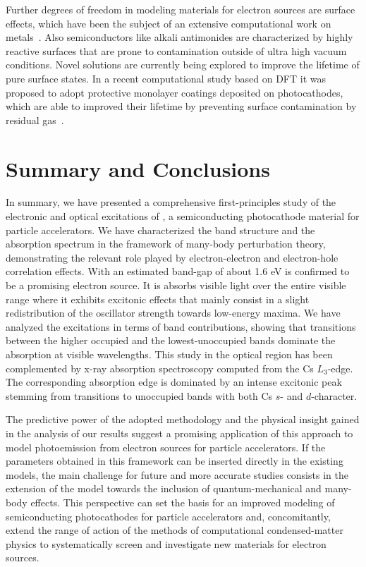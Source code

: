 \documentclass[aps,pra,superscriptaddress,twocolumn]{revtex4}
\begin{document}
Further degrees of freedom in modeling materials for electron sources are surface effects, which have been the subject of an extensive computational work on metals~\cite{cami+16cms}.
Also semiconductors like alkali antimonides are characterized by highly reactive surfaces that are prone to contamination outside of ultra high vacuum conditions.
Novel solutions are currently being explored to improve the lifetime of pure surface states.
In a recent computational study based on DFT it was proposed to adopt protective monolayer coatings deposited on  photocathodes, which are able to improved their lifetime by preventing surface contamination by residual gas~\cite{wang+18npj2dma}.  

\section{Summary and Conclusions}
\label{sec:conclusions}
In summary, we have presented a comprehensive first-principles study of the electronic and optical excitations of , a semiconducting photocathode material for particle accelerators. 
We have characterized the band structure and the absorption spectrum in the framework of many-body perturbation theory, demonstrating the relevant role played by electron-electron and electron-hole correlation effects. 
With an estimated band-gap of about 1.6 eV  is confirmed to be a promising electron source.
It is absorbs visible light over the entire visible range where it exhibits excitonic effects that mainly consist in a slight redistribution of the oscillator strength towards low-energy maxima.
We have analyzed the excitations in terms of band contributions, showing that transitions between the higher occupied and the lowest-unoccupied bands dominate the absorption at visible wavelengths.
This study in the optical region has been complemented by x-ray absorption spectroscopy computed from the Cs $L_3$-edge.
The corresponding absorption edge is dominated by an intense excitonic peak stemming from transitions to unoccupied bands with both Cs $s$- and $d$-character. 

The predictive power of the adopted methodology and the physical insight gained in the analysis of our results suggest a promising application of this approach to model photoemission from electron sources for particle accelerators. 
If the parameters obtained in this framework can be inserted directly in the existing models, the main challenge for future and more accurate studies consists in the extension of the model towards the inclusion of quantum-mechanical and many-body effects.
This perspective can set the basis for an improved modeling of semiconducting photocathodes for particle accelerators and, concomitantly, extend the range of action of the methods of computational condensed-matter physics to systematically screen and investigate new materials for electron sources.
\end{document}

